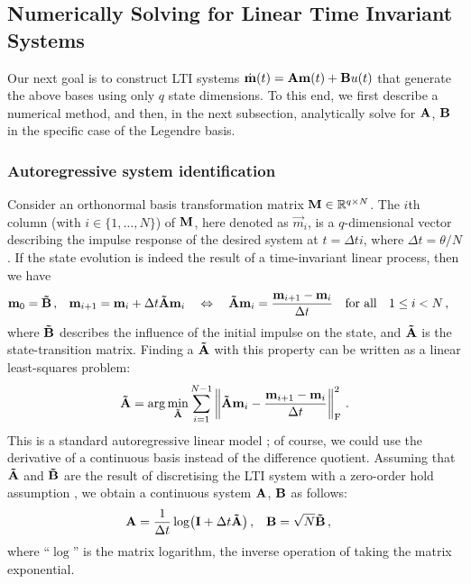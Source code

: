 \subsection{Numerically Solving for Linear Time Invariant Systems}
\label{sec:lti_autoregression}

Our next goal is to construct LTI systems $\dot{\mathbf{m}}(t) = \mathbf{A} \mathbf{m}(t) + \mathbf{B} u(t)$ that generate the above bases using only $q$ state dimensions.
To this end, we first describe a numerical method, and then, in the next subsection, analytically solve for $\mathbf{A}$, $\mathbf{B}$ in the specific case of the Legendre basis.

\subsubsection{Autoregressive system identification}
Consider an orthonormal basis transformation matrix $\mathbf{M} \in \mathbb{R}^{q \times N}$. The $i$th column (with $i \in \{1, \ldots, N\}$) of $\mathbf{M}$, here denoted as $\vec m_i$, is a $q$-dimensional vector describing the impulse response of the desired system at $t = \Delta t i$, where $\Delta t = \theta / N$.
If the state evolution is indeed the result of a time-invariant linear process, then we have
\begin{align*}
	\mathbf{m}_0 &= \mathbf{\tilde B} \,, &
	\mathbf{m}_{i + 1} &= \mathbf{m}_{i} + \Delta t \mathbf{\tilde A} \mathbf{m}_i
	\quad \Leftrightarrow \quad
	\mathbf{\tilde A} \mathbf{m}_{i} = \frac{\mathbf{m}_{i + 1} - \mathbf{m}_i}{\Delta t} \quad \text{for all} \quad 1 \leq i < N \,,
\end{align*}
where $\mathbf{\tilde B}$ describes the influence of the initial impulse on the state, and $\mathbf{\tilde A}$ is the state-transition matrix.
Finding a $\mathbf{\tilde A}$ with this property can be written as a linear least-squares problem:
\begin{align}
	\mathbf{\tilde A} = \arg\min_{\mathbf{\tilde A}} \sum_{i = 1}^{N - 1} \left\| \mathbf{\tilde A} \mathbf{m}_i - \frac{\mathbf{m}_{i + 1} - \mathbf{m}_i}{\Delta t} \right\|_\mathrm{F}^2 \,.
	\label{eqn:construct_lti_lstsq}
\end{align}
This is a standard autoregressive linear model \citep[cf.][Chapter~8]{verhaegen2007filtering}; of course, we could use the derivative of a continuous basis instead of the difference quotient.
Assuming that $\mathbf{\tilde A}$ and $\mathbf{\tilde B}$ are the result of discretising the LTI system with a zero-order hold assumption \citep[e.g.,][Section~9.8]{brogan1991modern}, we obtain a continuous system $\mathbf{A}$, $\mathbf{B}$ as follows:
\begin{align}
 	\mathbf{A} &= \frac{1}{\Delta t} \log\bigl(\mathbf{I}  + \Delta t \mathbf{\tilde A}\bigr) \,, &
 	\mathbf{B} &= \sqrt{N} \mathbf{\tilde B} \,,
 	\label{eqn:lti_inverse_discretisation}
\end{align}
where \enquote{$\log$} is the matrix logarithm, the inverse operation of taking the matrix exponential.

